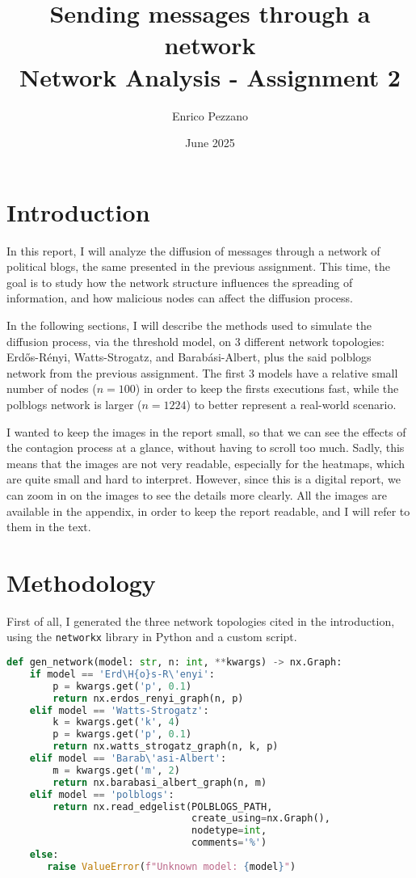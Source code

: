 \documentclass{article}
\title{\textbf{Sending messages through a network} \\ \vspace{0.5em}
  \large Network Analysis - Assignment 2}
\author{Enrico Pezzano}
\date{June 2025}
\begin{document}
\maketitle

\section{Introduction}\label{sec:intro} %
In this report, I will analyze the diffusion of messages through a network of political blogs, the same presented in the previous assignment.
This time, the goal is to study how the network structure influences the spreading of information, and how malicious nodes can affect the diffusion process.

In the following sections, I will describe the methods used to simulate the diffusion process, via the threshold model, on 3 different network topologies: Erd\H{o}s-R\'enyi, Watts-Strogatz, and Barab\'asi-Albert, plus the said polblogs network from the previous assignment.
The first 3 models have a relative small number of nodes ($n=100$) in order to keep the firsts executions fast, while the polblogs network is larger ($n=1224$) to better represent a real-world scenario.

I wanted to keep the images in the report small, so that we can see the effects of the contagion process at a glance, without having to scroll too much.
Sadly, this means that the images are not very readable, especially for the heatmaps, which are quite small and hard to interpret.
However, since this is a digital report, we can zoom in on the images to see the details more clearly.
All the images are available in the appendix, in order to keep the report readable, and I will refer to them in the text.

\section{Methodology}\label{sec:methodology} %
First of all, I generated the three network topologies cited in the introduction, using the \texttt{networkx} library in Python and a custom script.

\begin{lstlisting}[language=Python, caption=Network generation script]
def gen_network(model: str, n: int, **kwargs) -> nx.Graph:
    if model == 'Erd\H{o}s-R\'enyi':
        p = kwargs.get('p', 0.1)
        return nx.erdos_renyi_graph(n, p)
    elif model == 'Watts-Strogatz':
        k = kwargs.get('k', 4)
        p = kwargs.get('p', 0.1)
        return nx.watts_strogatz_graph(n, k, p)
    elif model == 'Barab\'asi-Albert':
        m = kwargs.get('m', 2)
        return nx.barabasi_albert_graph(n, m)
    elif model == 'polblogs':
        return nx.read_edgelist(POLBLOGS_PATH, 
                                create_using=nx.Graph(),
                                nodetype=int, 
                                comments='%')
    else:
       raise ValueError(f"Unknown model: {model}")
\end{lstlisting}
\end{document}
